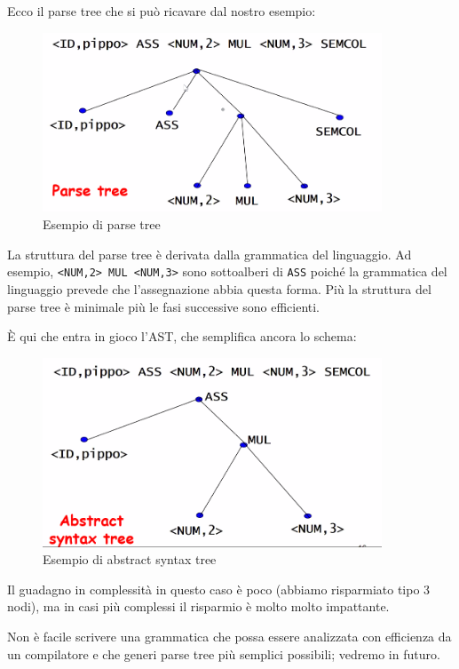 \documentclass[class=book, crop=false, oneside]{standalone}
\begin{document}
Ecco il parse tree che si può ricavare dal nostro esempio: 
\begin{figure}[H]
	\centering
	\includegraphics[width=0.9\textwidth,keepaspectratio]{parse_tree}
	\caption{Esempio di parse tree}
\end{figure}
La struttura del parse tree è derivata dalla grammatica del linguaggio. Ad esempio, \texttt{<NUM,2> MUL <NUM,3>} sono sottoalberi di \texttt{ASS} poiché la grammatica del linguaggio prevede che l’assegnazione abbia questa forma.
Più la struttura del parse tree è minimale più le fasi successive sono efficienti.

È qui che entra in gioco l’AST, che semplifica ancora lo schema:
\begin{figure}[H]
	\centering
	\includegraphics[width=0.9\textwidth,keepaspectratio]{abstract_syntax_tree}
	\caption{Esempio di abstract syntax tree}
\end{figure}
Il guadagno in complessità in questo caso è poco (abbiamo risparmiato tipo 3 nodi), ma in casi più complessi il risparmio è molto molto impattante.

Non è facile scrivere una grammatica che possa essere analizzata con efficienza da un compilatore e che generi parse tree più semplici possibili; vedremo in futuro.
\end{document}
